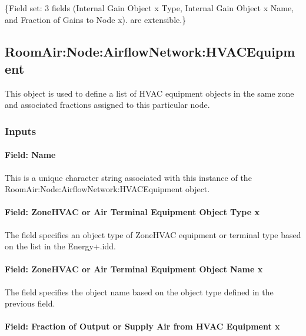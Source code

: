 \{Field set: 3 fields (Internal Gain Object x Type, Internal Gain Object x Name, and Fraction of Gains to Node x). are extensible.\}

\subsection{RoomAir:Node:AirflowNetwork:HVACEquipment}\label{roomairnodeairflownetworkhvacequipment}

This object is used to define a list of HVAC equipment objects in the same zone and associated fractions assigned to this particular node.

\subsubsection{Inputs}\label{inputs-15-012}

\paragraph{Field: Name}\label{field-name-11-012}

This is a unique character string associated with this instance of the Room\-Air:\-Node:\-Air\-flow\-Net\-work:\-HVAC\-Equipment object.

\paragraph{Field: ZoneHVAC or Air Terminal Equipment Object Type x}\label{field-zonehvac-or-air-terminal-equipment-object-type-x}

The field specifies an object type of ZoneHVAC equipment or terminal type based on the list in the Energy+.idd.

\paragraph{Field: ZoneHVAC or Air Terminal Equipment Object Name x}\label{field-zonehvac-or-air-terminal-equipment-object-name-x}

The field specifies the object name based on the object type defined in the previous field.

\paragraph{Field: Fraction of Output or Supply Air from HVAC Equipment x}\label{field-fraction-of-output-or-supply-air-from-hvac-equipment-x}

